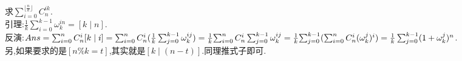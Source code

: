 求$\sum_{i=0}^{\lfloor \frac{n}{k} \rfloor} {C_n^{ik}}$.\\
引理:$\frac{1}{k} \sum_{i=0}^{k-1} \omega_{k}^{in} = [k \mid n]$.\\
反演:$Ans = \sum_{i=0}^n{C_n^i [k \mid i]} \\= \sum_{i=0}^n{C_n^i(\frac{1}{k}\sum_{j=0}^{k-1}{\omega_k^{ij}})} \\= \frac{1}{k} {\sum_{i=0}^{n}C_n^i \sum_{j=0}^{k-1} \omega_k^{ij}} \\= \frac{1}{k} {\sum_{j=0}^{k-1}(\sum_{i=0}^n C_n^i(\omega_k^j)^i)} \\= \frac{1}{k} \sum_{j=0}^{k-1} (1+\omega_k^j)^n$.\\
另,如果要求的是$[n \% k = t]$,其实就是$[k \mid (n-t)]$.同理推式子即可.